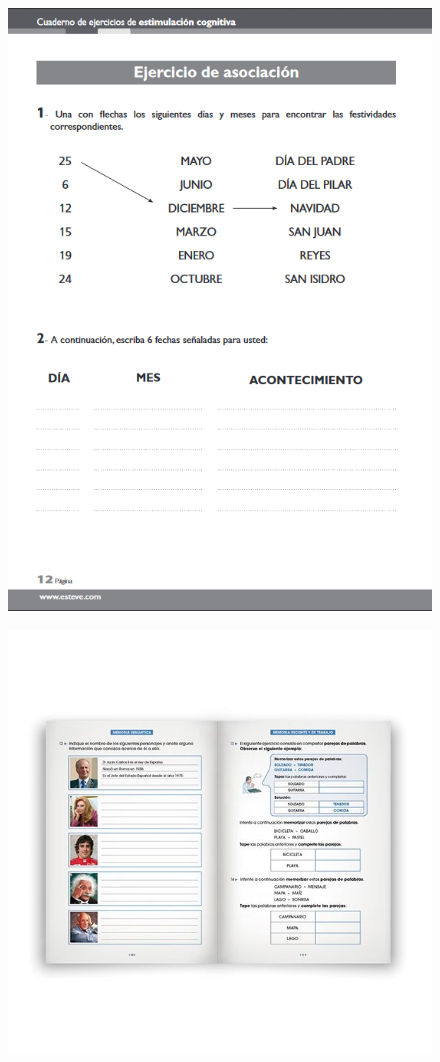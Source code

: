 \begin{figure}[H]
\centering
\begin{minipage}{.5\textwidth}
  \centering
  \includegraphics[width=.7\linewidth]{03.EstudioProblema/01.EstadoArte/00.Figuras/02.cuaderno_esteve.png}
  \label{fig:EA_cuadernoEsteve}
\end{minipage}%
\begin{minipage}{.5\textwidth}
  \centering
  \includegraphics[width=.9\linewidth]{03.EstudioProblema/01.EstadoArte/00.Figuras/03.cuaderno_rubio.jpg}
  \label{fig:EA_cuardernoRubio}
\end{minipage}
\end{figure}



